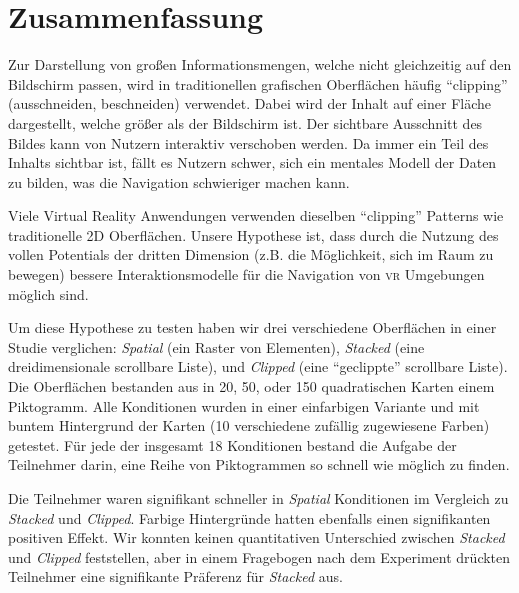 \documentclass[nobib]{tufte-book} %
\begin{document}
\chapter{Zusammenfassung}
Zur Darstellung von gro{\ss}en Informationsmengen, welche nicht gleichzeitig auf den Bildschirm passen, wird in traditionellen grafischen Oberfl{\"a}chen h{\"a}ufig ``clipping'' (ausschneiden, beschneiden) verwendet. Dabei wird der Inhalt auf einer Fl{\"a}che dargestellt, welche gr{\"o}{\ss}er als der Bildschirm ist. Der sichtbare Ausschnitt des Bildes kann von Nutzern interaktiv verschoben werden. Da immer ein Teil des Inhalts sichtbar ist, f{\"a}llt es Nutzern schwer, sich ein mentales Modell der Daten zu bilden, was die Navigation schwieriger machen kann.

Viele Virtual Reality Anwendungen verwenden dieselben ``clipping'' Patterns wie traditionelle 2D Oberfl{\"a}chen. Unsere Hypothese ist, dass durch die Nutzung des vollen Potentials der dritten Dimension (z.B. die M{\"o}glichkeit, sich im Raum zu bewegen) bessere Interaktionsmodelle f{\"u}r die Navigation von \textsc{vr} Umgebungen m{\"o}glich sind.

Um diese Hypothese zu testen haben wir drei verschiedene Oberfl{\"a}chen in einer Studie verglichen: \emph{Spatial} (ein Raster von Elementen), \emph{Stacked} (eine dreidimensionale scrollbare Liste), und \emph{Clipped} (eine ``geclippte'' scrollbare Liste). Die Oberfl{\"a}chen bestanden aus in 20, 50, oder 150 quadratischen Karten einem Piktogramm. Alle Konditionen wurden in einer einfarbigen Variante und mit buntem Hintergrund der Karten (10 verschiedene zuf{\"a}llig zugewiesene Farben) getestet. F{\"u}r jede der insgesamt 18 Konditionen bestand die Aufgabe der Teilnehmer darin, eine Reihe von Piktogrammen so schnell wie m{\"o}glich zu finden.

Die Teilnehmer waren signifikant schneller in \emph{Spatial} Konditionen im Vergleich zu \emph{Stacked} und \emph{Clipped}. Farbige Hintergr{\"u}nde hatten ebenfalls einen signifikanten positiven Effekt. Wir konnten keinen quantitativen Unterschied zwischen \emph{Stacked} und \emph{Clipped} feststellen, aber in einem Fragebogen nach dem Experiment dr{\"u}ckten Teilnehmer eine signifikante Pr{\"a}ferenz f{\"u}r \emph{Stacked} aus.


\end{document}
